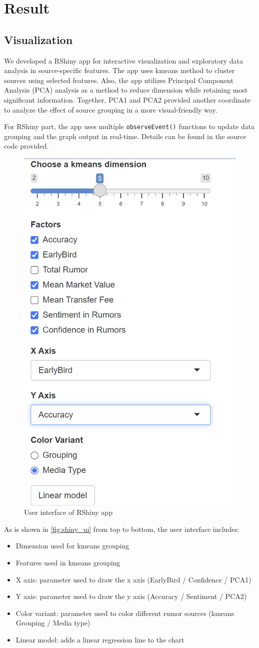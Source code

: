 \section{Result}
\label{sec:4_exp}

\subsection{Visualization} 

We developed a RShiny app for interactive visualization and exploratory data analysis in source-specific features. The app uses kmeans method to cluster sources using selected features. Also, the app utilizes Principal Component Analysis (PCA) analysis as a method to reduce dimension while retaining most significant information. Together, PCA1 and PCA2 provided another coordinate to analyze the effect of source grouping in a more visual-friendly way.

For RShiny part, the app uses multiple \texttt{observeEvent()} functions to update data grouping and the graph output in real-time. Details can be found in the source code provided.

\begin{figure}[ht]
    \centering
    \includegraphics[width=.4\textwidth]{figs/shiny_ui.png}
    \caption{
        User interface of RShiny app
    }\label{fig:shiny_ui}
\end{figure}

As is shown in \autoref{fig:shiny_ui} from top to bottom, the user interface includes:
\begin{itemize}
    \item Dimension used for kmeans grouping
    \item Features used in kmeans grouping
    \item X axis: parameter used to draw the x axis (EarlyBird / Confidence / PCA1)
    \item Y axis: parameter used to draw the y axis (Accuracy / Sentiment / PCA2)
    \item Color variant: parameter used to color different rumor sources (kmeans Grouping / Media type)
    \item Linear model: adds a linear regression line to the chart
\end{itemize}

